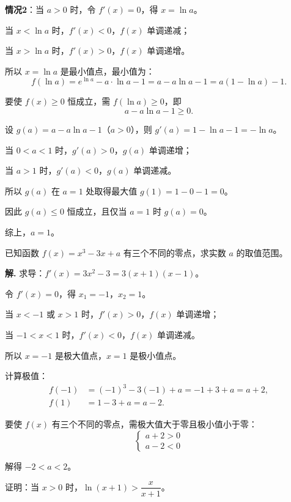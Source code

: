 \documentclass[11pt]{ctexrep}
\begin{document}
\textbf{情况2}：当 $a > 0$ 时，令 $f'(x) = 0$，得 $x = \ln a$。

当 $x < \ln a$ 时，$f'(x) < 0$，$f(x)$ 单调递减；

当 $x > \ln a$ 时，$f'(x) > 0$，$f(x)$ 单调递增。

所以 $x = \ln a$ 是最小值点，最小值为：
\[
    f(\ln a) = e^{\ln a} - a \cdot \ln a - 1 = a - a\ln a - 1 = a(1 - \ln a) - 1.
\]

要使 $f(x) \ge 0$ 恒成立，需 $f(\ln a) \ge 0$，即
\[
    a - a\ln a - 1 \ge 0.
\]

设 $g(a) = a - a\ln a - 1$（$a > 0$），则 $g'(a) = 1 - \ln a - 1 = -\ln a$。

当 $0 < a < 1$ 时，$g'(a) > 0$，$g(a)$ 单调递增；

当 $a > 1$ 时，$g'(a) < 0$，$g(a)$ 单调递减。

所以 $g(a)$ 在 $a = 1$ 处取得最大值 $g(1) = 1 - 0 - 1 = 0$。

因此 $g(a) \le 0$ 恒成立，且仅当 $a = 1$ 时 $g(a) = 0$。

综上，$a = 1$。

\begin{realexam}[2024 上海一模]
    已知函数 $f(x) = x^3 - 3x + a$ 有三个不同的零点，求实数 $a$ 的取值范围。
\end{realexam}

\textbf{解.} 求导：$f'(x) = 3x^2 - 3 = 3(x + 1)(x - 1)$。

令 $f'(x) = 0$，得 $x_1 = -1$，$x_2 = 1$。

当 $x < -1$ 或 $x > 1$ 时，$f'(x) > 0$，$f(x)$ 单调递增；

当 $-1 < x < 1$ 时，$f'(x) < 0$，$f(x)$ 单调递减。

所以 $x = -1$ 是极大值点，$x = 1$ 是极小值点。

计算极值：
\begin{align*}
    f(-1) &= (-1)^3 - 3(-1) + a = -1 + 3 + a = a + 2, \\[4pt]
    f(1) &= 1 - 3 + a = a - 2.
\end{align*}

要使 $f(x)$ 有三个不同的零点，需极大值大于零且极小值小于零：
\[
    \begin{cases}
        a + 2 > 0 \\[4pt]
        a - 2 < 0
    \end{cases}
\]

解得 $-2 < a < 2$。

\begin{realexam}[2025 上海二模]
    证明：当 $x > 0$ 时，$\ln(x + 1) > \dfrac{x}{x + 1}$。
\end{realexam}
\end{document}
